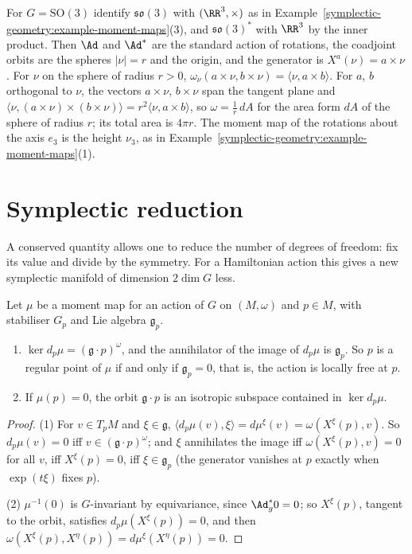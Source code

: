 \begin{example}\label{symplectic-geometry:example-coadjoint-so3}
For $G = \mathrm{SO}(3)$ identify $\mathfrak{so}(3)$ with $(\RR^3, \times)$ as in Example~\ref{symplectic-geometry:example-moment-maps}(3), and $\mathfrak{so}(3)^*$ with $\RR^3$ by the inner product. Then $\Ad$ and $\Ad^*$ are
the standard action of rotations, the coadjoint orbits are the spheres $|\nu| = r$ and the origin, and the generator is $X^a(\nu) = a \times \nu$. For $\nu$ on the sphere of radius $r > 0$,
$\omega_\nu(a \times \nu, b \times \nu) = \langle\nu, a \times b\rangle$. For $a$, $b$ orthogonal to $\nu$, the vectors $a \times \nu$, $b \times \nu$ span the tangent plane and
$\langle\nu, (a \times \nu) \times (b \times \nu)\rangle = r^2\langle\nu, a \times b\rangle$, so $\omega = \frac1r\,dA$ for the area form $dA$ of the sphere of radius $r$; its total area is $4\pi r$. The moment map of the
rotations about the axis $e_3$ is the height $\nu_3$, as in Example~\ref{symplectic-geometry:example-moment-maps}(1).
\end{example}

\section{Symplectic reduction}\label{symplectic-geometry:section-reduction}

A conserved quantity allows one to reduce the number of degrees of freedom: fix its value and divide by the symmetry. For a Hamiltonian action this gives a new symplectic manifold of dimension $2\dim G$ less.

\begin{lemma}\label{symplectic-geometry:lemma-moment-map-linear}
Let $\mu$ be a moment map for an action of $G$ on $(M, \omega)$ and $p \in M$, with stabiliser $G_p$ and Lie algebra $\mathfrak{g}_p$.
\begin{enumerate}
\item $\ker d_p\mu = (\mathfrak{g} \cdot p)^\omega$, and the annihilator of the image of $d_p\mu$ is $\mathfrak{g}_p$. So $p$ is a regular point of $\mu$ if and only if $\mathfrak{g}_p = 0$, that is, the action is locally free at $p$.
\item If $\mu(p) = 0$, the orbit $\mathfrak{g} \cdot p$ is an isotropic subspace contained in $\ker d_p\mu$.
\end{enumerate}
\end{lemma}

\begin{proof}
(1) For $v \in T_pM$ and $\xi \in \mathfrak{g}$, $\langle d_p\mu(v), \xi\rangle = d\mu^\xi(v) = \omega(X^\xi(p), v)$. So $d_p\mu(v) = 0$ iff $v \in (\mathfrak{g} \cdot p)^\omega$; and $\xi$ annihilates the image iff
$\omega(X^\xi(p), v) = 0$ for all $v$, iff $X^\xi(p) = 0$, iff $\xi \in \mathfrak{g}_p$ (the generator vanishes at $p$ exactly when $\exp(t\xi)$ fixes $p$).

(2) $\mu^{-1}(0)$ is $G$-invariant by equivariance, since $\Ad^*_g0 = 0$; so $X^\xi(p)$, tangent to the orbit, satisfies $d_p\mu(X^\xi(p)) = 0$, and then $\omega(X^\xi(p), X^\eta(p)) = d\mu^\xi(X^\eta(p)) = 0$.
\end{proof}

